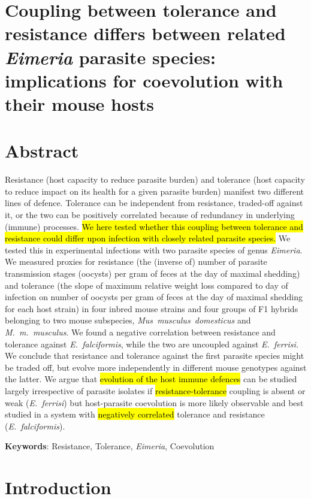 \documentclass[12pt]{article}
\begin{document}
\section*{Coupling between tolerance and resistance differs between related \textit{Eimeria} parasite species: implications for coevolution with their mouse hosts}

\section*{Abstract}
Resistance (host capacity to reduce parasite burden) and tolerance (host capacity to reduce impact on its health for a given parasite burden) manifest two different lines of defence. Tolerance can be independent from resistance, traded-off against it, or the two can be positively correlated because of redundancy in underlying (immune) processes. \hl{We here tested whether this coupling between tolerance and resistance could differ upon infection with closely related parasite species.}
We tested this in experimental infections with two parasite species of genus \textit{Eimeria}. We measured proxies for resistance (the (inverse of) number of parasite transmission stages (oocysts) per gram of feces at the day of maximal shedding) and tolerance (the slope of maximum relative weight loss compared to day of infection on number of oocysts per gram of feces at the day of maximal shedding for each host strain) in four inbred mouse strains and four groups of F1 hybrids belonging to two mouse subspecies, \textit{Mus~musculus~domesticus} and \textit{M.~m.~musculus}. We found a negative correlation between resistance and tolerance against \textit{E.~falciformis}, while the two are uncoupled against \textit{E.~ferrisi.} We conclude that resistance and tolerance against the first parasite species might be traded off, but evolve more independently in different mouse genotypes against the latter. We argue that \hl{evolution of the host immune defences} can be studied largely irrespective of parasite isolates if \hl{resistance-tolerance} coupling is absent or weak (\textit{E.~ferrisi}) but host-parasite coevolution is more likely observable and best studied in a system with \hl{negatively correlated} tolerance and resistance (\textit{E.~falciformis}).

\textbf{Keywords}: Resistance, Tolerance, \textit{Eimeria}, Coevolution

\section*{Introduction}
\end{document}
